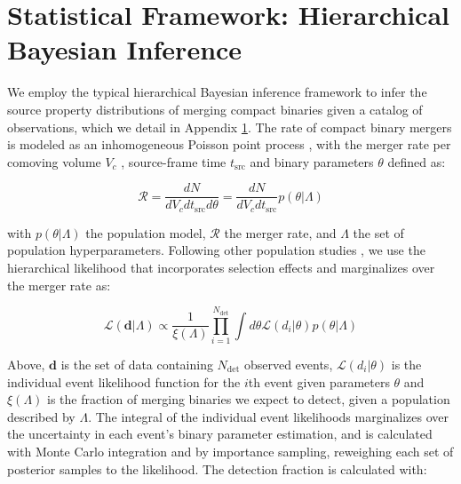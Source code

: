 \appendix

\section{Statistical Framework: Hierarchical Bayesian Inference} \label{sec:bayesian-inference}

We employ the typical hierarchical Bayesian inference framework to infer the source property distributions of merging compact binaries given a catalog of observations, which we detail in Appendix \ref{sec:bayesian-inference}. The rate of compact binary mergers is modeled as an inhomogeneous Poisson point process \citep{10.1093/mnras/stz896}, with the merger rate per comoving volume $V_c$ \citep{astro-ph/9905116}, source-frame time $t_\text{src}$ and binary parameters $\theta$ defined as:

\begin{equation} \label{eq:rate}
    \mathcal{R} = \frac{dN}{dV_cdt_\mathrm{src}d\theta} = \frac{dN}{dV_cdt_\mathrm{src}} p(\theta | \Lambda)
\end{equation}

\noindent with $p(\theta | \Lambda)$ the population model, $\mathcal{R}$ the merger rate, and $\Lambda$ the set of population hyperparameters. Following other population studies \citep{10.1093/mnras/stz896,2021ApJ...913L...7A,2023PhRvX..13a1048A,2007.05579}, we use the hierarchical likelihood \citep{10.1063/1.1835214} that incorporates selection effects and marginalizes over the merger rate as: 

\begin{equation} \label{eq:likelihood}
    \mathcal{L}(\bm{d} | \Lambda) \propto \frac{1}{\xi(\Lambda)} \prod_{i=1}^{N_\mathrm{det}} \int d\theta \mathcal{L}(d_i | \theta) p(\theta | \Lambda)
\end{equation}

\noindent Above, $\bm{d}$ is the set of data containing $N_\mathrm{det}$ observed events, $\mathcal{L}(d_i | \theta)$ is the individual event likelihood function for the $i$th event given parameters $\theta$ and $\xi(\Lambda)$ is the fraction of merging binaries we expect to detect, given a population described by $\Lambda$. The integral of the individual event likelihoods marginalizes over the uncertainty in each event's binary parameter estimation, and is calculated with Monte Carlo integration and by importance sampling, reweighing each set of posterior samples to the likelihood. The detection fraction is calculated with:

